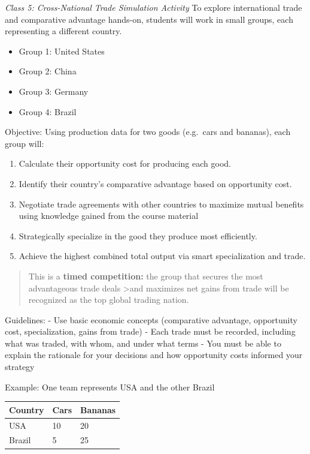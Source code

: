 \documentclass[
  11pt,
]{article}
\providecommand{\tightlist}{%
  \setlength{\itemsep}{0pt}\setlength{\parskip}{0pt}}
\begin{document}
\emph{Class 5: Cross-National Trade Simulation Activity} To explore
international trade and comparative advantage hands-on, students will
work in small groups, each representing a different country.

\begin{itemize}
\tightlist
\item
  Group 1: United States\\
\item
  Group 2: China\\
\item
  Group 3: Germany\\
\item
  Group 4: Brazil
\end{itemize}

Objective: Using production data for two goods (e.g.~cars and bananas),
each group will:

\begin{enumerate}
\def\labelenumi{\arabic{enumi}.}
\tightlist
\item
  Calculate their opportunity cost for producing each good.
\item
  Identify their country's comparative advantage based on opportunity
  cost.
\item
  Negotiate trade agreements with other countries to maximize mutual
  benefits using knowledge gained from the course material
\item
  Strategically specialize in the good they produce most efficiently.
\item
  Achieve the highest combined total output via smart specialization and
  trade.
\end{enumerate}

\begin{quote}
This is a \textbf{timed competition:} the group that secures the most
advantageous trade deals \textgreater and maximizes net gains from trade
will be recognized as the top global trading nation.
\end{quote}

Guidelines: - Use basic economic concepts (comparative advantage,
opportunity cost, specialization, gains from trade) - Each trade must be
recorded, including what was traded, with whom, and under what terms -
You must be able to explain the rationale for your decisions and how
opportunity costs informed your strategy

Example: One team represents USA and the other Brazil

\begin{longtable}[]{@{}lll@{}}
\toprule\noalign{}
Country & Cars & Bananas \\
\midrule\noalign{}
\endhead
\bottomrule\noalign{}
\endlastfoot
USA & 10 & 20 \\
Brazil & 5 & 25 \\
\end{longtable}
\end{document}

